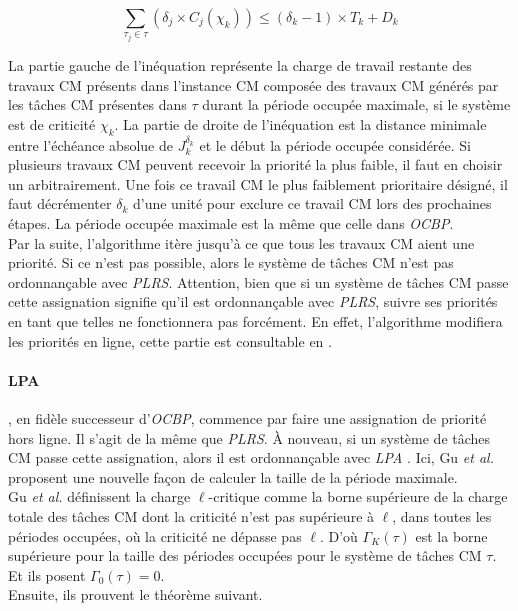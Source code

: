 \documentclass[12pt,a4paper,oneside]{book}
\theoremstyle{break}
\theoremstyle{breakplain}
\begin{document}
\begin{equation}
\underset{\tau_j \in \tau}{\sum} (\delta_j \times C_j(\chi_k)) \le (\delta_k-1) \times T_k + D_k
\end{equation}

La partie gauche de l'inéquation représente la charge de travail restante des travaux CM présents dans l'instance CM composée des travaux CM générés par les tâches CM présentes dans $\tau$ durant la période occupée maximale, si le système est de criticité $\chi_k$. La partie de droite de l'inéquation est la distance minimale entre l'échéance absolue de $J^{\delta_k}_k$ et le début la période occupée considérée. Si plusieurs travaux CM peuvent recevoir la priorité la plus faible, il faut en choisir un arbitrairement. Une fois ce travail CM le plus faiblement prioritaire désigné, il faut décrémenter $\delta_k$ d'une unité pour exclure ce travail CM lors des prochaines étapes. La période occupée maximale est la même que celle dans \textit{OCBP}.\\

Par la suite, l'algorithme itère jusqu'à ce que tous les travaux CM aient une priorité. Si ce n'est pas possible, alors le système de tâches CM n'est pas ordonnançable avec \textit{PLRS}. Attention, bien que si un système de tâches CM passe cette assignation signifie qu'il est ordonnançable avec \textit{PLRS}, suivre ses priorités en tant que telles ne fonctionnera pas forcément. En effet, l'algorithme modifiera les priorités en ligne, cette partie est consultable en \cite{guan2011effective}.

\paragraph{LPA}, en fidèle successeur d'\textit{OCBP}, commence par faire une assignation de priorité hors ligne. Il s'agit de la même que \textit{PLRS}. À nouveau, si un système de tâches CM passe cette assignation, alors il est ordonnançable avec \textit{LPA} \cite{gu2013improving}. Ici, Gu \textit{et al.} proposent une nouvelle façon de calculer la taille de la période maximale.\\

Gu \textit{et al.} définissent la charge $\ell$-critique comme la borne supérieure de la charge totale des tâches CM dont la criticité n'est pas supérieure à $\ell$, dans toutes les périodes occupées, où la criticité ne dépasse pas $\ell$. D'où $\Gamma_K(\tau)$ est la borne supérieure pour la taille des périodes occupées pour le système de tâches CM $\tau$. Et ils posent $\Gamma_0(\tau) = 0$.\\
Ensuite, ils prouvent le théorème suivant.\\
\end{document}
